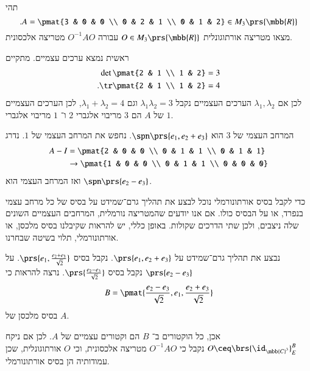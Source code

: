 \documentclass[a4paper,10pt,oneside,openany]{article}
\begin{document}
\begin{exercise}
תהי
\[\text{.} A = \pmat{3 & 0 & 0 \\ 0 & 2 & 1 \\ 0 & 1 & 2} \in M_3\prs{\mbb{R}}\]
מצאו מטריצה אורתוגונלית
$O \in M_3\prs{\mbb{R}}$
עבורה
$O^{-1} A O$
מטריצה אלכסונית.
\end{exercise}

\begin{solution}
ראשית נמצא ערכים עצמיים. מתקיים
\begin{align*}
\det\pmat{2 & 1 \\ 1 & 2} &= 3 \\
\text{.} \tr\pmat{2 & 1 \\ 1 & 2} &= 4 
\end{align*}
לכן אם
$\lambda_1, \lambda_2$
הערכים העצמיים נקבל
$\lambda_1 \lambda_2 = 3$
וגם
$\lambda_1 + \lambda_2 = 4$,
לכן הערכים העצמיים של
$A$
הם
$3$
מריבוי אלגברי
$2$
ו־%
$1$
מריבוי אלגברי
$1$.

המרחב העצמי של
$3$
הוא
$\spn\prs{e_1, e_2 + e_3}$.
נחפש את המרחב העצמי של
$1$.
נדרג
\begin{align*}
A - I &= \pmat{2 & 0 & 0 \\ 0 & 1 & 1 \\ 0 & 1 & 1}
\\&\to \pmat{1 & 0 & 0 \\ 0 & 1 & 1 \\ 0 & 0 & 0}
\end{align*}
ואז המרחב העצמי הוא
$\spn\prs{e_2 - e_3}$.

כדי לקבל בסיס אורתונורמלי נוכל לבצע את תהליך גרם־שמידט על בסיס של כל מרחב עצמי בנפרד, או על הבסיס כולו. אם אנו יודעים שהמטריצה נורמלית, המרחבים העצמיים השונים שלה ניצבים, ולכן שתי הדרכים שקולות. באופן כללי, יש להראות שקיבלנו בסיס מלכסן, או אורתונורמלי, תלוי בשיטה שבחרנו.

נבצע את תהליך גרם־שמידט על
$\prs{e_1, e_2+e_3}$.
נקבל בסיס
$\prs{e_1, \frac{e_2 + e_3}{\sqrt{2}}}$.
על
$\prs{e_2 - e_3}$
נקבל בסיס
$\prs{\frac{e_2 - e_3}{\sqrt{2}}}$.
נרצה להראות כי
\[B = \pmat{\frac{e_2 - e_3}{\sqrt{2}}, e_1, \frac{e_2 + e_3}{\sqrt{2}}}\]
בסיס מלכסן של
$A$.

אכן, כל הוקטורים ב־%
$B$
הם וקטורים עצמיים של
$A$.
לכן אם ניקח
$O \ceq \brs{\id_{\mbb{C}^3}}^B_E$
נקבל כי
$O^{-1} A O$
מטריצה אלכסונית, וכי
$O$
אורתוגונלית, שכן עמודותיה הן בסיס אורתונורמלי.
\end{solution}
\end{document}
